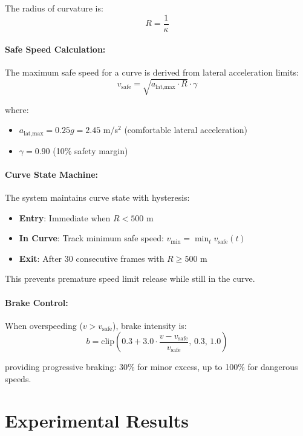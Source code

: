 \documentclass[11pt,a4paper]{article}
\begin{document}
The radius of curvature is:
\begin{equation}
R = \frac{1}{\kappa}
\end{equation}

\paragraph{Safe Speed Calculation:}
The maximum safe speed for a curve is derived from lateral acceleration limits:
\begin{equation}
v_{\text{safe}} = \sqrt{a_{\text{lat,max}} \cdot R} \cdot \gamma
\end{equation}

where:
\begin{itemize}
    \item $a_{\text{lat,max}} = 0.25g = 2.45$ m/s$^2$ (comfortable lateral acceleration)
    \item $\gamma = 0.90$ (10\% safety margin)
\end{itemize}

\paragraph{Curve State Machine:}
The system maintains curve state with hysteresis:
\begin{itemize}
    \item \textbf{Entry}: Immediate when $R < 500$ m
    \item \textbf{In Curve}: Track minimum safe speed: $v_{\text{min}} = \min_t v_{\text{safe}}(t)$
    \item \textbf{Exit}: After 30 consecutive frames with $R \geq 500$ m
\end{itemize}

This prevents premature speed limit release while still in the curve.

\paragraph{Brake Control:}
When overspeeding ($v > v_{\text{safe}}$), brake intensity is:
\begin{equation}
b = \text{clip}\left(0.3 + 3.0 \cdot \frac{v - v_{\text{safe}}}{v_{\text{safe}}}, \, 0.3, \, 1.0\right)
\end{equation}

providing progressive braking: 30\% for minor excess, up to 100\% for dangerous speeds.

\section{Experimental Results}
\end{document}
